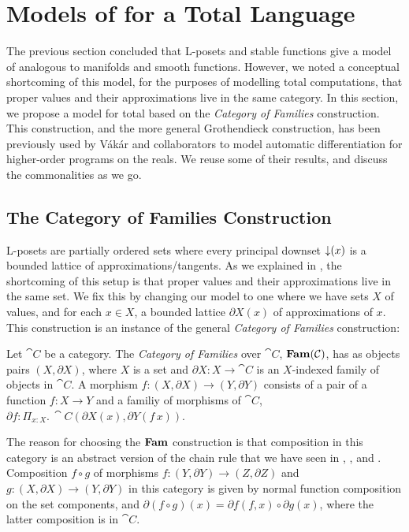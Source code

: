 \section{Models of \GPS for a Total Language}
\label{sec:models-of-total-gps}

The previous section concluded that L-posets and stable functions give
a model of \GPS analogous to manifolds and smooth functions. However,
we noted a conceptual shortcoming of this model, for the purposes of
modelling total computations, that proper values and their
approximations live in the same category. In this section, we propose
a model for total \GPS based on the \emph{Category of Families}
construction. This construction, and the more general Grothendieck
construction, has been previously used by V{\'a}k{\'a}r and
collaborators  to model automatic differentiation for
higher-order programs on the reals. We reuse some of their results,
and discuss the commonalities as we go.

\subsection{The Category of Families Construction}

L-posets are partially ordered sets where every principal downset
$\mathop{\downarrow}(x)$ is a bounded lattice of approximations/tangents. As we
explained in , the shortcoming of this setup is that
proper values and their approximations live in the same set. We fix
this by changing our model to one where we have sets $X$ of values,
and for each $x \in X$, a bounded lattice $\partial X(x)$ of
approximations of $x$. This construction is an instance of the general
\emph{Category of Families} construction:

\begin{definition}
  Let $\cat{C}$ be a category. The \emph{Category of Families} over
  $\cat{C}$, $\mathbf{Fam}(\mathcal{C})$, has as objects pairs $(X, \partial X)$,
  where $X$ is a set and $\partial X : X \to \cat{C}$ is an
  $X$-indexed family of objects in $\cat{C}$. A morphism
  $f : (X, \partial X) \to (Y, \partial Y)$ consists of a pair of a
  function $f : X \to Y$ and a familiy of morphisms of $\cat{C}$,
  $\partial f : \Pi_{x : X}.\,\cat{C}(\partial X(x), \partial Y(f\,x))$.
\end{definition}

The reason for choosing the $\mathbf{Fam}$ construction is that composition in
this category is an abstract version of the chain rule that we have
seen in , , and
. Composition $f \circ g $ of morphisms
$f : (Y, \partial Y) \to (Z, \partial Z)$ and
$g : (X, \partial X) \to (Y, \partial Y)$ in this category is given by
normal function composition on the set components, and
$\partial (f \circ g)(x) = \partial f(f, x) \circ \partial g(x)$,
where the latter composition is in $\cat{C}$.

